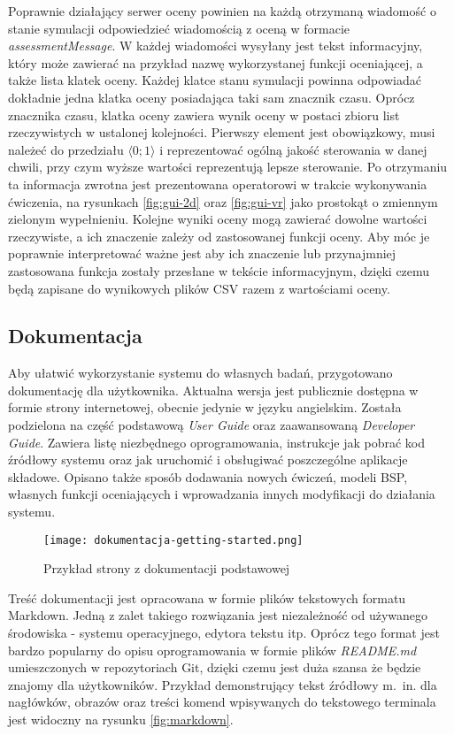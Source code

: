 Poprawnie działający serwer oceny powinien na każdą otrzymaną wiadomość o stanie symulacji odpowiedzieć wiadomością z oceną w formacie \emph{assessmentMessage}. W każdej wiadomości wysyłany jest tekst informacyjny, który może zawierać na przykład nazwę wykorzystanej funkcji oceniającej, a także lista klatek oceny. Każdej klatce stanu symulacji powinna odpowiadać dokładnie jedna klatka oceny posiadająca taki sam znacznik czasu. Oprócz znacznika czasu, klatka oceny zawiera wynik oceny w postaci zbioru list rzeczywistych w ustalonej kolejności. Pierwszy element jest obowiązkowy, musi należeć do przedziału $ \langle 0; 1 \rangle $ i reprezentować ogólną jakość sterowania w danej chwili, przy czym wyższe wartości reprezentują lepsze sterowanie. Po otrzymaniu ta informacja zwrotna jest prezentowana operatorowi w trakcie wykonywania ćwiczenia, na rysunkach \ref{fig:gui-2d} oraz \ref{fig:gui-vr} jako prostokąt o zmiennym zielonym wypełnieniu. Kolejne wyniki oceny mogą zawierać dowolne wartości rzeczywiste, a ich znaczenie zależy od zastosowanej funkcji oceny. Aby móc je poprawnie interpretować ważne jest aby ich znaczenie lub przynajmniej zastosowana funkcja zostały przesłane w tekście informacyjnym, dzięki czemu będą zapisane do wynikowych plików CSV razem z wartościami oceny.

\subsection{Dokumentacja}
Aby ułatwić wykorzystanie systemu do własnych badań, przygotowano dokumentację dla użytkownika. Aktualna wersja jest publicznie dostępna w formie strony internetowej\cite{uavdocs2021}, obecnie jedynie w języku angielskim. Została podzielona na część podstawową \emph{User Guide} oraz zaawansowaną \emph{Developer Guide}. Zawiera listę niezbędnego oprogramowania, instrukcje jak pobrać kod źródłowy systemu oraz jak uruchomić i obsługiwać poszczególne aplikacje składowe. Opisano także sposób dodawania nowych ćwiczeń, modeli BSP, własnych funkcji oceniających i wprowadzania innych modyfikacji do działania systemu.

\begin{figure}[!h]
    \centering \texttt{[image: dokumentacja-getting-started.png]}
    \caption{Przykład strony z dokumentacji podstawowej}
    \label{fig:dokumentacja-getting-started}
\end{figure}

Treść dokumentacji jest opracowana w formie plików tekstowych formatu Markdown\cite{rfc7763}. Jedną z zalet takiego rozwiązania jest niezależność od używanego środowiska - systemu operacyjnego, edytora tekstu itp. Oprócz tego format jest bardzo popularny do opisu oprogramowania w formie plików \emph{README.md} umieszczonych w repozytoriach Git, dzięki czemu jest duża szansa że będzie znajomy dla użytkowników. Przykład demonstrujący tekst źródłowy m.~in. dla nagłówków, obrazów oraz treści komend wpisywanych do tekstowego terminala jest widoczny na rysunku \ref{fig:markdown}.

